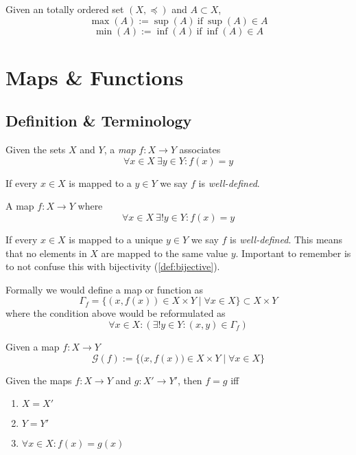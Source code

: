 \begin{definition}
   Given an totally ordered set \((X, \preceq)\) and \(A \subset X\),
   \[\max(A) := \sup(A)~\text{if}~\sup(A) \in A\]
   \[\min(A) := \inf(A)~\text{if}~\inf(A) \in A\]
\end{definition}

\section{Maps \& Functions}
\subsection{Definition \& Terminology}
\begin{definition}[Map]\label{def:map}
   Given the sets \(X\) and \(Y\), a \emph{map} \(f: X \to Y\) associates
   \[\forall x \in X~\exists y \in Y: f(x) = y\]
\end{definition}
\begin{remark}[Terminology]
   If every \(x \in X\) is mapped to a \(y \in Y\) we say \(f\) is \emph{well-defined}.
\end{remark}

\begin{definition}[Function]
   A map \(f: X \to Y\) where
   \[\forall x \in X~\exists! y \in Y: f(x) = y\]
\end{definition}
\begin{remark}[Terminology]
   If every \(x \in X\) is mapped to a unique \(y \in Y\) we say \(f\) is \emph{well-defined}.
   This means that no elements in \(X\) are mapped to the same value \(y\).
   Important to remember is to not confuse this with bijectivity (\ref{def:bijective}).
\end{remark}

Formally we would define a map or function as
\[\Gamma_f = \big\{(x, f(x)) \in X \times Y \mid \forall x \in X\big\} \subset X \times Y\]
where the condition above would be reformulated as
\[\forall x \in X: (\exists! y \in Y: (x, y) \in \Gamma_f)\]

\begin{definition}
   Given a map \(f: X \to Y\)
   \[\mathcal{G}(f) := \Big\{\big(x, f(x)\big) \in X \times Y \mid \forall x \in X\Big\}\]
\end{definition}

\begin{definition}
   Given the maps \(f: X \to Y\) and \(g: X' \to Y'\), then \(f = g\) iff
   \begin{enumerate}[label=\roman*, align=Center]
      \item \(X = X'\)
      \item \(Y = Y'\)
      \item \(\forall x \in X: f(x) = g(x)\)
   \end{enumerate}
\end{definition}

